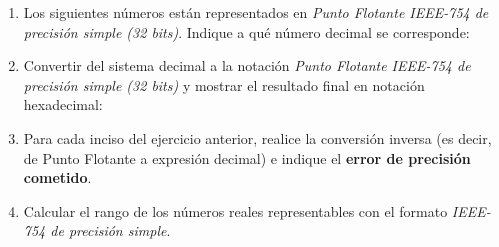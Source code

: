\documentclass[12pt]{article}
\begin{document}
\begin{enumerate}[resume]

    \item Los siguientes números están representados en \emph{Punto Flotante
        IEEE-754 de precisión simple (32 bits)}. Indique a qué número decimal
        se corresponde:


    \item Convertir del sistema decimal a la notación \emph{Punto Flotante
        IEEE-754 de precisión simple (32 bits)} y mostrar el resultado final
        en notación hexadecimal:


    \item Para cada inciso del ejercicio anterior, realice la conversión
        inversa (es decir, de Punto Flotante a expresión decimal) e indique el
        \textbf{error de precisión cometido}.

    \item Calcular el rango de los números reales representables con el
        formato \emph{IEEE-754 de precisión simple}.

\end{enumerate}
\end{document}
